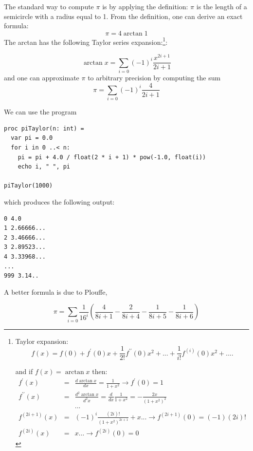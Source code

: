 \documentclass[justified, sixbynine]{tufte-book}
\theoremstyle{plain}%
\newtheorem * {corollary}{Corollary}
\theoremstyle{definition}
\theoremstyle{remark}
\newtheorem * {remark}{Remark}
\newtheorem * {note}{Note}
\begin{document}
\begin{fullwidth}
The standard way to compute $\pi $ is by applying the definition: $\pi $ is
the length of a semicircle with a radius equal to 1. From the definition, one can
derive an exact formula:
\begin{equation}
\pi =4\arctan 1
\end{equation}
The arctan has the following Taylor series expansion:\footnote{%
Taylor expansion:
\begin{equation}
f(x)=f(0)+f^{\prime }(0)x+\frac 1{2!}f^{\prime \prime }(0)x^2+...+\frac
1{i!}f^{(i)}(0)x^2+....
\end{equation}
\par
and if $f(x)=\arctan x$ then:
\begin{eqnarray}
f^{\prime }(x) &=&\frac{d\arctan x}{dx}=\frac 1{1+x^2}\rightarrow f^{\prime
}(0)=1 \\
f^{\prime \prime }(x) &=&\frac{d^2\arctan x}{d^2x}=\frac d{dx}\frac
1{1+x^2}=-\frac{2x}{(1+x^2)^2} \\
&&... \\
f^{(2i+1)}(x) &=&(-1)^i\frac{(2i)!}{(1+x^2)^{2i+1}}+x...\rightarrow
f^{(2i+1)}(0)=(-1)(2i)! \\
f^{(2i)}(x) &=&x...\rightarrow f^{(2i)}(0)=0
\end{eqnarray}
}:

\begin{equation}
\arctan x=\allowbreak \sum_{i=0}(-1)^i\frac{x^{2i+1}}{2i+1}
\end{equation}
and one can approximate $\pi $ to arbitrary precision by computing the sum
\begin{equation}
\pi =\allowbreak \sum_{i=0}(-1)^i\frac 4{2i+1}
\end{equation}

We can use the program
\begin{lstlisting}
proc piTaylor(n: int) =
  var pi = 0.0
  for i in 0 ..< n:
    pi = pi + 4.0 / float(2 * i + 1) * pow(-1.0, float(i))
    echo i, " ", pi

piTaylor(1000)
\end{lstlisting}

which produces the following output:
\begin{lstlisting}
0 4.0
1 2.66666...
2 3.46666...
3 2.89523...
4 3.33968...
...
999 3.14..
\end{lstlisting}

A better formula is due to Plouffe,

\begin{equation}
\pi = \sum_{i=0} \frac{1}{16^i} \left(
\frac{4}{8i+1}-\frac{2}{8i+4}-\frac{1}{8i+5}-\frac{1}{8i+6}
\right)
\end{equation}


\end{fullwidth}
\end{document}
